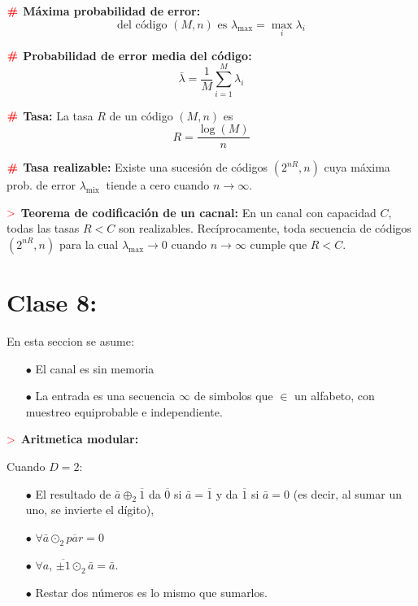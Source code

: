\documentclass[%
 reprint,
 amsmath,amssymb,
 aps,
]{revtex4-1}
\begin{document}
\textbf{$\color{red}{\textbf{\#}}$ Máxima probabilidad de error:} 
$$
\text{del código } (M, n) \text{ es }
\lambda_{\operatorname{max}}=\operatorname{max}_{i} \lambda_{i}
$$

\textbf{$\color{red}{\textbf{\#}}$ Probabilidad de error media del código:} 
$$
\bar{\lambda}=\frac{1}{M} \sum_{i=1}^{M} \lambda_{i}
$$

\textbf{$\color{red}{\textbf{\#}}$ Tasa:} 
La tasa $R$ de un código $(M, n)$ es
$$
R=\frac{\log (M)}{n}
$$

\textbf{$\color{red}{\textbf{\#}}$ Tasa realizable:} 
Existe una sucesión de códigos $\left(2^{n R}, n\right)$ cuya máxima prob. de error $\lambda_{\text {mix }}$ tiende a cero cuando $n \rightarrow \infty$.

\textbf{$\textcolor{red}{\mathbf{>}}$ Teorema de codificación de un cacnal:} 
En un canal con capacidad $C,$ todas las tasas $R<C$ son realizables. Recíprocamente, toda secuencia de códigos $\left(2^{n R}, n\right)$ para la cual $\lambda_{\operatorname{max}} \rightarrow 0$ cuando $n \rightarrow \infty$ cumple que $R<C$.

\section{Clase 8:}

En esta seccion se asume:
\begin{itemize}
  \item[$\bullet$] El canal es sin memoria
  \item[$\bullet$] La entrada es una secuencia $\infty$ de simbolos que $\in$ un alfabeto, con muestreo equiprobable e independiente.
\end{itemize}

\textbf{$\textcolor{red}{\mathbf{>}}$ Aritmetica modular:}

Cuando $D=2$:
\begin{itemize}
  \item[$\bullet$] El resultado de $\bar{a} \oplus_{2} \overline{1}$ da $\overline{0}$ si $\bar{a}=\overline{1}$ y da $\overline{1}$ si $\bar{a}=0$ (es decir, al sumar un uno, se invierte el dígito),
  \item[$\bullet$] $\forall \bar{a} \odot_{2} \overline{par}=0$
  \item[$\bullet$] $\forall a$,
  $\overline{\pm1} \odot_{2} \bar{a}=\bar{a}$.
  \item[$\bullet$] Restar dos números es lo mismo que sumarlos.
\end{itemize}
\end{document}
